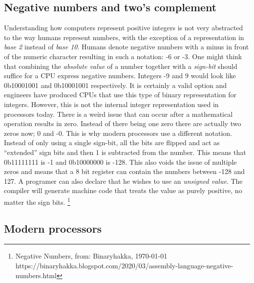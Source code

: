 \subsection{Negative numbers and two's complement}

Understanding how computers represent positive integers is not very abstracted to the way humans
represent numbers, with the exception of a representation in \textit{base 2} instead of \textit{base 10}. Humans
denote negative numbers with a minus in front of the numeric character resulting in such a notation: 
-6 or -3. One might think that combining the \textit{absolute value} of a number together with a \textit{sign-bit}
should suffice for a CPU express negative numbers. Integers -9 and 9 would look like 0b10001001 and
0b10001001 respectively. It is certainly a valid option and engineers have produced
CPUs that use this type of binary representation for integers. However, this is not the 
internal integer representation used in processors today. There is a weird issue that can occur after
a mathematical operation results in zero. Instead of there being one zero there are actually two 
zeros now; 0 and -0. This is why modern processors use a different notation. Instead of only using a
single sign-bit, all the bits are flipped and act as “extended” sign bits and then 1 is subtracted 
from the number. This means that 0b11111111 is -1 and 0b10000000 is -128. This also voids the issue 
of multiple zeros and means that a 8 bit register can contain the numbers between -128 and 127. 
A programer can also declare that he wishes to use an \textit{unsigned value}. The compiler will generate
machine code that treats the value as purely positive, no matter the sign bits. \footnote{Negative Numbers, from: Binaryhakka, \today \\ https://binaryhakka.blogspot.com/2020/03/assembly-language-negative-numbers.html}



\subsection{Modern processors}

